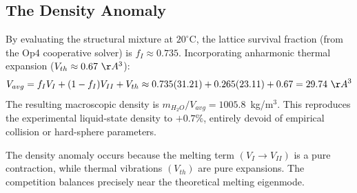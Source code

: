 \subsection{The Density Anomaly}
By evaluating the structural mixture at $20^\circ$C, the lattice survival fraction (from the Op4 cooperative solver) is $f_I \approx 0.735$. Incorporating anharmonic thermal expansion ($V_{th} \approx 0.67\ \AA^3$):
\begin{equation}
    V_{avg} = f_I V_I + (1-f_I) V_{II} + V_{th} 
    \approx 0.735(31.21) + 0.265(23.11) + 0.67 = 29.74\ \AA^3
\end{equation}
The resulting macroscopic density is $m_{H_2O} / V_{avg} = 1005.8$~kg/m$^3$. This reproduces the experimental liquid-state density to $+0.7\%$, entirely devoid of empirical collision or hard-sphere parameters.

The density anomaly occurs because the melting term $(V_I \to V_{II})$ is a pure contraction, while thermal vibrations $(V_{th})$ are pure expansions. The competition balances precisely near the theoretical melting eigenmode.


